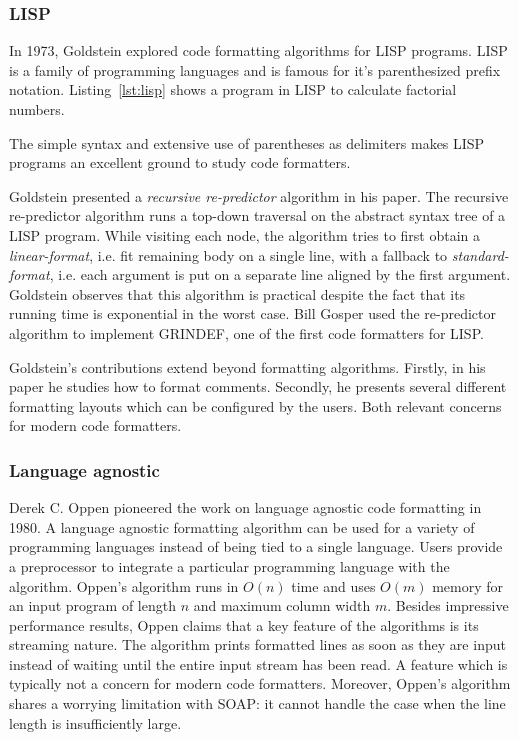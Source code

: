 \subsubsection{LISP}\label{sec:lisp}
In 1973, Goldstein\autocite{goldstein_pretty-printing_1973} explored code formatting algorithms for LISP\autocite{mccarthy_recursive_1960} programs.
LISP is a family of programming languages and is famous for it's parenthesized prefix notation.
Listing~\ref{lst:lisp} shows a program in LISP to calculate factorial numbers.

The simple syntax and extensive use of parentheses as delimiters makes LISP programs an excellent ground to study code formatters.

Goldstein presented a \emph{recursive re-predictor} algorithm in his paper.
The recursive re-predictor algorithm runs a top-down traversal on the abstract syntax tree of a LISP program.
While visiting each node, the algorithm tries to first obtain a \emph{linear-format},
i.e. fit remaining body on a single line,
with a fallback to \emph{standard-format},
i.e. each argument is put on a separate line aligned by the first argument.
Goldstein observes that this algorithm is practical despite the fact that its running time is exponential in the worst case.
Bill Gosper used the re-predictor algorithm to implement GRINDEF\autocite{_bill_????}, one of the first code formatters for LISP.

Goldstein's contributions extend beyond formatting algorithms.
Firstly, in his paper he studies how to format comments.
Secondly, he presents several different formatting layouts which can be configured by the users.
Both relevant concerns for modern code formatters.

\subsubsection{Language agnostic}\label{sec:agnostic}
Derek C. Oppen pioneered the work on language agnostic code formatting in 1980\autocite{oppen_prettyprinting_1980}.
A language agnostic formatting algorithm can be used for a variety of programming languages instead of being
tied to a single language.
Users provide a preprocessor to integrate a particular programming language with the algorithm.
Oppen's algorithm runs in $O(n)$ time and uses $O(m)$ memory for an input program of length $n$ and maximum column width $m$.
Besides impressive performance results, Oppen claims that a key feature of the algorithms is its streaming nature.
The algorithm prints formatted lines as soon as they are input instead of waiting until the entire input stream has been read.
A feature which is typically not a concern for modern code formatters.
Moreover, Oppen's algorithm shares a worrying limitation with SOAP: it cannot handle the case when the line length is insufficiently large.

